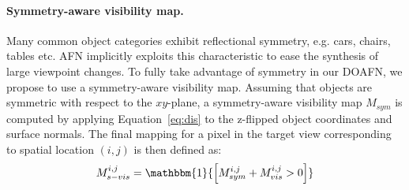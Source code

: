 \documentclass[10pt,twocolumn,letterpaper]{article}
\begin{document}
\paragraph{Symmetry-aware visibility map.}
Many common object categories exhibit reflectional symmetry, e.g. cars, chairs, tables etc. 
AFN implicitly exploits this characteristic to ease the synthesis of large viewpoint changes. To fully take advantage of symmetry in our DOAFN, we propose to use a symmetry-aware visibility map.
Assuming that objects are symmetric with respect to the $xy$-plane, a symmetry-aware visibility map $M_{sym}$ is computed by applying Equation~\ref{eq:dis} to the z-flipped object coordinates and surface normals. The final mapping for a pixel in the target view corresponding to spatial location $(i,j)$ is then defined as:
\begin{equation}
M_{s-vis}^{i,j} = \mathbbm{1}{\left[ M_{sym}^{i,j} + M_{vis}^{i,j} > 0 \right]}
\end{equation}
\end{document}
